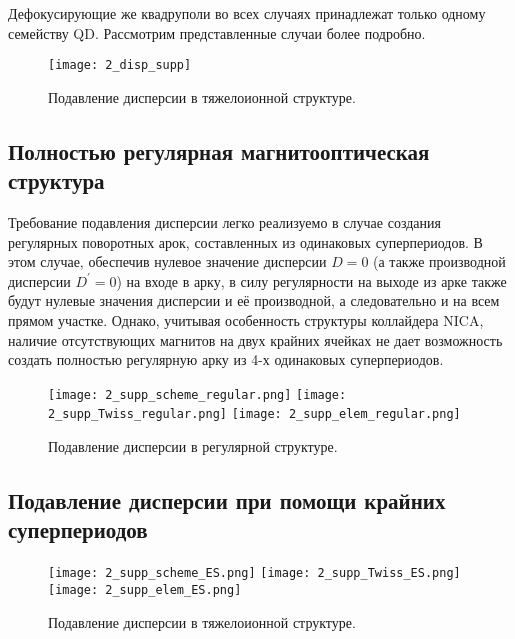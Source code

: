 \noindent Дефокусирующие же квадруполи во всех случаях принадлежат только одному семейству QD. Рассмотрим представленные случаи  более подробно.

\begin{figure} [h!]
	\center
	\texttt{[image: 2\_disp\_supp]}
	\caption{Подавление дисперсии в тяжелоионной структуре.}
	\label{fig:2_disp_supp}
\end{figure}

\subsection{Полностью регулярная магнитооптическая структура}\label{subsec:transition_variation/disp_supperssion/regular}

\par Требование подавления дисперсии легко реализуемо в случае создания регулярных поворотных арок, составленных из одинаковых суперпериодов. В этом случае, обеспечив нулевое значение дисперсии $D=0$ (а также производной дисперсии $D^{\prime}=0$) на входе в арку, в силу регулярности на выходе из арке также будут нулевые значения дисперсии и её производной, а следовательно и на всем прямом участке. Однако, учитывая особенность структуры коллайдера NICA, наличие отсутствующих магнитов на двух крайних ячейках не дает возможность создать полностью регулярную арку из 4-х одинаковых суперпериодов.

\begin{figure} [h!]
   \center
   \texttt{[image: 2\_supp\_scheme\_regular.png]}
   \texttt{[image: 2\_supp\_Twiss\_regular.png]}
   \texttt{[image: 2\_supp\_elem\_regular.png]}
   \caption{Подавление дисперсии в регулярной структуре.}
   \label{fig:2_disp_supp_full_regular}
\end{figure}
	
\subsection{Подавление дисперсии при помощи крайних суперпериодов}\label{subsec:transition_variation/disp_supperssion/ES}

\par	
\begin{figure} [h!]
   \center
   \texttt{[image: 2\_supp\_scheme\_ES.png]}
   \texttt{[image: 2\_supp\_Twiss\_ES.png]}
   \texttt{[image: 2\_supp\_elem\_ES.png]}
   \caption{Подавление дисперсии в тяжелоионной структуре.}
   \label{fig:2_disp_supp_ES}
\end{figure}		

